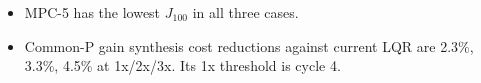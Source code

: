 \begin{itemize}
\item MPC-5 has the lowest $J_{100}$ in all three cases.
\item Common-P gain synthesis cost reductions against current LQR are 2.3\%, 3.3\%, 4.5\% at 1x/2x/3x. Its 1x threshold is cycle 4.
\end{itemize}
